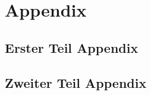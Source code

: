 %

\chapter{Appendix}
\label{ch:Appendix}

\section{Erster Teil Appendix}
\label{app:first_appendix} 

\section{Zweiter Teil Appendix}
\label{app:second_appendix}  


